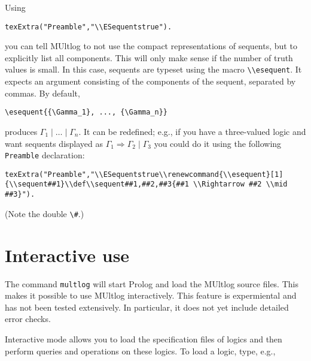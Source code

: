 \documentclass[
]{article}
\newcommand{\passthrough}[1]{#1}
\begin{document}
Using

\begin{lstlisting}
texExtra("Preamble","\\ESequentstrue").
\end{lstlisting}

you can tell MUltlog to not use the compact representations of sequents,
but to explicitly list all components. This will only make sense if the
number of truth values is small. In this case, sequents are typeset
using the macro \passthrough{\lstinline!\\esequent!}. It expects an
argument consisting of the components of the sequent, separated by
commas. By default,

\begin{lstlisting}
\esequent{{\Gamma_1}, ..., {\Gamma_n}}
\end{lstlisting}

produces \(\Gamma_1 \mid \dots \mid \Gamma_n\). It can be redefined;
e.g., if you have a three-valued logic and want sequents displayed as
\(\Gamma_1 \Rightarrow \Gamma_2 \mid \Gamma_3\) you could do it using
the following \passthrough{\lstinline!Preamble!} declaration:

\begin{lstlisting}
texExtra("Preamble","\\ESequentstrue\\renewcommand{\\esequent}[1]{\\sequent##1}\\def\\sequent##1,##2,##3{##1 \\Rightarrow ##2 \\mid ##3}").
\end{lstlisting}

(Note the double \passthrough{\lstinline!\#!}.)

\hypertarget{interactive-use}{%
\section{Interactive use}\label{interactive-use}}

The command \passthrough{\lstinline!multlog!} will start Prolog and load
the MUltlog source files. This makes it possible to use MUltlog
interactively. This feature is expermiental and has not been tested
extensively. In particular, it does not yet include detailed error
checks.

Interactive mode allows you to load the specification files of logics
and then perform queries and operations on these logics. To load a
logic, type, e.g.,
\end{document}
